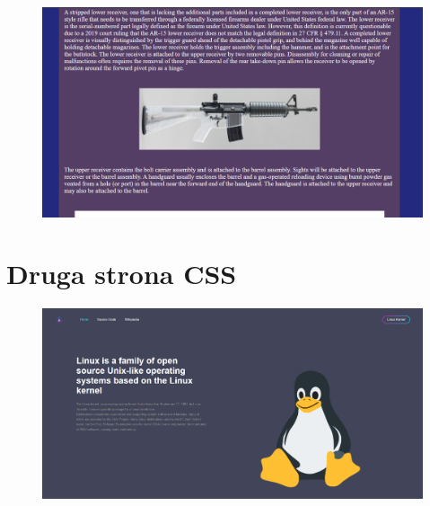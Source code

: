 \documentclass{article}
\begin{document}
\begin{figure}[h!]
    \includegraphics[scale=0.25]{2.png}
    \centering
\end{figure}
 
\newpage
\section{Druga strona CSS}

\begin{figure}[h!]
    \includegraphics[scale=0.25]{3.png}
    \centering
\end{figure}
\end{document}

